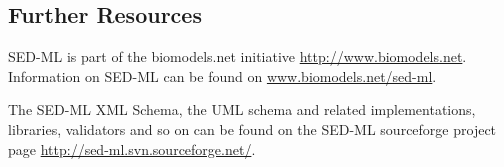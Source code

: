 \subsection{Further Resources}

SED-ML is part of the biomodels.net initiative \url{http://www.biomodels.net}. Information on SED-ML can be found on \url{www.biomodels.net/sed-ml}.

The SED-ML XML Schema, the UML schema and related implementations, libraries, validators and so on can be found on the SED-ML sourceforge project page \url{http://sed-ml.svn.sourceforge.net/}.



